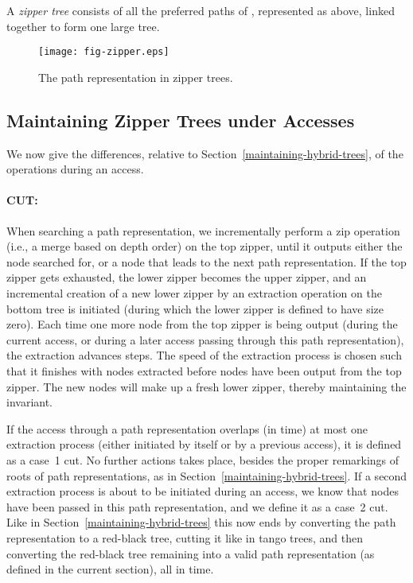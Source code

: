 \documentclass[letterpaper,11pt]{article}
\newcommand{\bottomtree}{bottom tree}
\begin{document}
A \emph{zipper tree} consists of all the preferred paths of ,
represented as above, linked together to form one large tree.

\begin{figure}\begin{center}
        \texttt{[image: fig-zipper.eps]}
    \end{center}
    \caption{\label{fig-zipper} The path representation in zipper trees.}
\end{figure}

\subsection{Maintaining Zipper Trees under Accesses}

We now give the differences, relative to
Section~\ref{maintaining-hybrid-trees}, of the operations during an access.

\paragraph{CUT:}
When searching a path representation, we incrementally perform a zip
operation (i.e., a merge based on depth order) on the top zipper, until
it outputs either the node searched for, or a node that leads to the next
path representation. If the top zipper gets exhausted, the lower zipper
becomes the upper zipper, and an incremental creation of a new lower zipper
by an extraction operation on the \bottomtree{} is initiated (during which
the lower zipper is defined to have size zero). Each time one more node
from the top zipper is being output (during the current access, or during a
later access passing through this path representation), the extraction
advances  steps. The speed of the extraction process is chosen
such that it finishes with  nodes extracted before  nodes have been output from the top zipper. The new nodes will make
up a fresh lower zipper, thereby maintaining the invariant.

If the access through a path representation overlaps (in time) at most one
extraction process (either initiated by itself or by a previous access), it
is defined as a case~1 cut. No further actions takes place, besides the
proper remarkings of roots of path representations, as in
Section~\ref{maintaining-hybrid-trees}. If a second extraction process is
about to be initiated during an access, we know that 
nodes have been passed in this path representation, and we define it as a
case~2 cut. Like in Section~\ref{maintaining-hybrid-trees} this now ends by
converting the path representation to a red-black tree, cutting it like in
tango trees, and then converting the red-black tree remaining into a valid
path representation (as defined in the current section), all in
 time.
\end{document}
